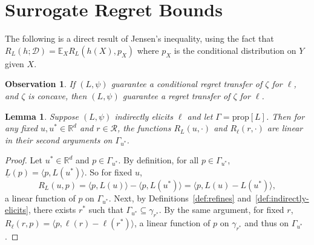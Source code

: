 \documentclass[11pt]{article}
\newcommand{\reals}{\mathbb{R}}
\newcommand{\prop}[1]{\mathrm{prop}[#1]}
\newcommand{\D}{\mathcal{D}}
\newcommand{\E}{\mathbb{E}}
\newcommand{\R}{\mathcal{R}}
\newcommand{\risk}[1]{\underline{#1}}
\newcommand{\inprod}[2]{\langle #1, #2 \rangle}%
\newcommand{\trim}{\mathrm{trim}}
\newtheorem{lemma}{Lemma}
\newtheorem{observation}{Observation}
\begin{document}



\section{Surrogate Regret Bounds} \label{app:regret-bounds}

The following is a direct result of Jensen's inequality, using the fact that $R_L(h;\D) = \E_X R_L(h(X),p_X)$ where $p_X$ is the conditional distribution on $Y$ given $X$.
\begin{observation} \label{obs:transfer}
  If $(L,\psi)$ guarantee a conditional regret transfer of $\zeta$ for $\ell$, and $\zeta$ is concave, then $(L,\psi)$ guarantee a regret transfer of $\zeta$ for $\ell$.
\end{observation}

\begin{lemma}\label{lemma:linear-on-levelset}
  Suppose $(L,\psi)$ indirectly elicits $\ell$ and let $\Gamma = \prop{L}$.
  Then for any fixed $u,u^* \in \reals^d$ and $r \in \R$, the functions $R_L(u,\cdot)$ and $R_{\ell}(r,\cdot)$ are linear in their second arguments on $\Gamma_{u^*}$.
\end{lemma}
\begin{proof}
  Let $u^* \in \reals^d$ and $p \in \Gamma_{u^*}$.
  By definition, for all $p \in \Gamma_{u^*}$, $\risk{L}(p) = \inprod{p}{L(u^*)}$.
  So for fixed $u$,
    \[ R_L(u,p) = \inprod{p}{L(u)} - \inprod{p}{L(u^*)} = \inprod{p}{L(u) - L(u^*)} , \]
  a linear function of $p$ on $\Gamma_{u^*}$.
  Next, by Definitions~\ref{def:refines} and~\ref{def:indirectly-elicits}, there exists $r^*$ such that $\Gamma_{u^*} \subseteq \gamma_{r^*}$.
  By the same argument, for fixed $r$, $R_{\ell}(r,p) = \inprod{p}{\ell(r) - \ell(r^*)}$, a linear function of $p$ on $\gamma_{r^*}$ and thus on $\Gamma_{u^*}$.
\end{proof}
\end{document}
